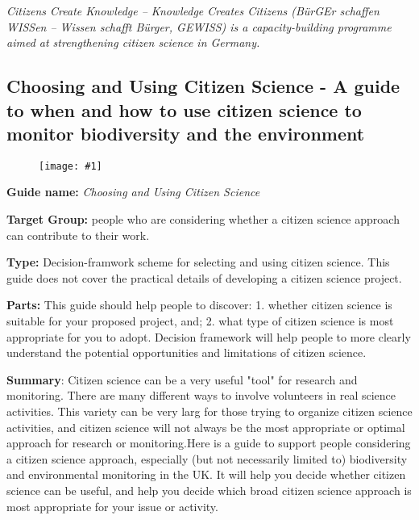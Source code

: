 \documentclass{article}
\newlength{\imgwidth}
\newcommand\scaledgraphics[2]{%
                
\settowidth{\imgwidth}{\texttt{[image: \#1]}}%
                
\setlength{\imgwidth}{\minof{\imgwidth}{#2\textwidth}}%
                
\texttt{[image: \#1]}%
                
}
\begin{document}
\emph{Citizens Create Knowledge – Knowledge Creates Citizens (BürGEr schaffen WISSen – Wissen schafft Bürger, GEWISS) is a capacity-building programme aimed at strengthening citizen science in Germany.}


\subsection{Choosing and Using Citizen Science - A guide to when and how to use citizen science to monitor biodiversity and the environment}\label{H1285339}



\begin{center}
\begin{figure}
\scaledgraphics{dba5d5eb-235c-4694-a2d4-c26b6e16182b.png}{0.75}
\label{F60064251}
\end{figure}


\end{center}


\textbf{Guide name: }\emph{Choosing and Using Citizen Science} \autocite{pocock_choosing_2014}


\textbf{Target Group: }people who are considering whether a citizen science approach can contribute to their work.


\textbf{Type: }Decision-framwork scheme for selecting and using citizen science. This guide does not cover the practical details of developing a citizen science project.


\textbf{Parts: }This guide should help people to discover:  1. whether citizen science is suitable for your proposed project, and;  2. what type of citizen science is most appropriate for you to adopt. Decision framework will help people to more clearly understand the potential opportunities and limitations of citizen science.


\textbf{Summary}: Citizen science can be a very useful "tool" for research and monitoring. There are many different ways to involve volunteers in real science activities. This variety can be very larg for those trying to organize citizen science activities, and citizen science will not always be the most appropriate or optimal approach for research or monitoring.Here is a guide to support people considering a citizen science approach, especially (but not necessarily limited to) biodiversity and environmental monitoring in the UK. It will help you decide whether citizen science can be useful, and help you decide which broad citizen science approach is most appropriate for your issue or activity. 
\end{document}
